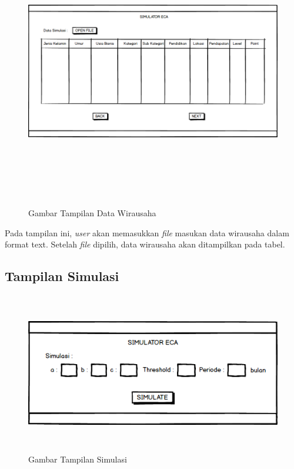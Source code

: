 \begin{figure} [H]
	\centering  
	\includegraphics[width=16cm, height=12cm]{mockup4-1} 
	\caption[Gambar Tampilan Data Wirausaha]{Gambar Tampilan Data Wirausaha}
	\label{fig:kondisiDataWirausaha} 
\end{figure}

Pada tampilan ini, \textit{user} akan memasukkan \textit{file} masukan data wirausaha dalam format text. Setelah \textit{file} dipilih, data wirausaha akan ditampilkan pada tabel.
\subsection{Tampilan Simulasi}

\begin{figure} [H]
	\centering  
	\includegraphics[width=12cm, height=7cm]{mockup5} 
	\caption[Gambar Tampilan Simulasi]{Gambar Tampilan Simulasi}
	\label{fig:simulasi} 
\end{figure}

